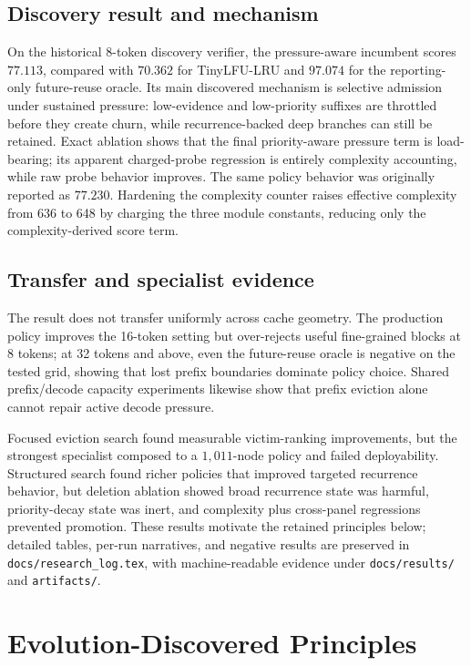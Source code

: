 \documentclass[11pt]{article}
\newcommand{\filepath}[1]{\nolinkurl{#1}}
\begin{document}
\subsection{Discovery result and mechanism}

On the historical 8-token discovery verifier, the pressure-aware incumbent scores
\(77.113\), compared with \(70.362\) for TinyLFU-LRU and \(97.074\) for the
reporting-only future-reuse oracle.  Its main discovered mechanism is selective
admission under sustained pressure: low-evidence and low-priority suffixes are
throttled before they create churn, while recurrence-backed deep branches can still be
retained.  Exact ablation shows that the final priority-aware pressure term is
load-bearing; its apparent charged-probe regression is entirely complexity accounting,
while raw probe behavior improves.
The same policy behavior was originally reported as \(77.230\).  Hardening the
complexity counter raises effective complexity from 636 to 648 by charging the three
module constants, reducing only the complexity-derived score term.

\subsection{Transfer and specialist evidence}

The result does not transfer uniformly across cache geometry.  The production policy
improves the 16-token setting but over-rejects useful fine-grained blocks at 8 tokens;
at 32 tokens and above, even the future-reuse oracle is negative on the tested grid,
showing that lost prefix boundaries dominate policy choice.  Shared prefix/decode
capacity experiments likewise show that prefix eviction alone cannot repair active
decode pressure.

Focused eviction search found measurable victim-ranking improvements, but the strongest
specialist composed to a \(1{,}011\)-node policy and failed deployability.  Structured
search found richer policies that improved targeted recurrence behavior, but deletion
ablation showed broad recurrence state was harmful, priority-decay state was inert, and
complexity plus cross-panel regressions prevented promotion.  These results motivate
the retained principles below; detailed tables, per-run narratives, and negative
results are preserved in \filepath{docs/research_log.tex}, with machine-readable
evidence under \filepath{docs/results/} and \filepath{artifacts/}.

\section{Evolution-Discovered Principles}
\label{sec:evolution-principles}
\end{document}
